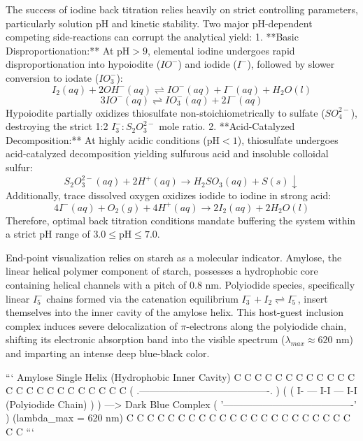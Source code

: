 \documentclass[12pt]{article}
\begin{document}
The success of iodine back titration relies heavily on strict controlling parameters, particularly solution pH and kinetic stability. Two major pH-dependent competing side-reactions can corrupt the analytical yield:
1. **Basic Disproportionation:** At $\text{pH} > 9$, elemental iodine undergoes rapid disproportionation into hypoiodite ($IO^-$) and iodide ($I^-$), followed by slower conversion to iodate ($IO_3^-$):
\begin{equation}
I_2(aq) + 2OH^-(aq) \rightleftharpoons IO^-(aq) + I^-(aq) + H_2O(l)
\end{equation}
\begin{equation}
3IO^-(aq) \rightleftharpoons IO_3^-(aq) + 2I^-(aq)
\end{equation}
Hypoiodite partially oxidizes thiosulfate non-stoichiometrically to sulfate ($SO_4^{2-}$), destroying the strict 1:2 $I_3^- : S_2O_3^{2-}$ mole ratio.
2. **Acid-Catalyzed Decomposition:** At highly acidic conditions ($\text{pH} < 1$), thiosulfate undergoes acid-catalyzed decomposition yielding sulfurous acid and insoluble colloidal sulfur:
\begin{equation}
S_2O_3^{2-}(aq) + 2H^+(aq) \longrightarrow H_2SO_3(aq) + S(s) \downarrow
\end{equation}
Additionally, trace dissolved oxygen oxidizes iodide to iodine in strong acid:
\begin{equation}
4I^-(aq) + O_2(g) + 4H^+(aq) \longrightarrow 2I_2(aq) + 2H_2O(l)
\end{equation}
Therefore, optimal back titration conditions mandate buffering the system within a strict pH range of $3.0 \le \text{pH} \le 7.0$.

End-point visualization relies on starch as a molecular indicator. Amylose, the linear helical polymer component of starch, possesses a hydrophobic core containing helical channels with a pitch of $0.8 \text{ nm}$. Polyiodide species, specifically linear $I_5^-$ chains formed via the catenation equilibrium $I_3^- + I_2 \rightleftharpoons I_5^-$, insert themselves into the inner cavity of the amylose helix. This host-guest inclusion complex induces severe delocalization of $\pi$-electrons along the polyiodide chain, shifting its electronic absorption band into the visible spectrum ($\lambda_{max} \approx 620 \text{ nm}$) and imparting an intense deep blue-black color. 

```
   Amylose Single Helix (Hydrophobic Inner Cavity)
   C C C C C C C C C C C C C C C C C C C C C C C C
  (  .----------------------------------------.  )
 (  (  I- --- I-I --- I-I  (Polyiodide Chain)  )  )  ---> Dark Blue Complex
  (  '----------------------------------------'  )        (lambda_max = 620 nm)
   C C C C C C C C C C C C C C C C C C C C C C C C
```
\end{document}
